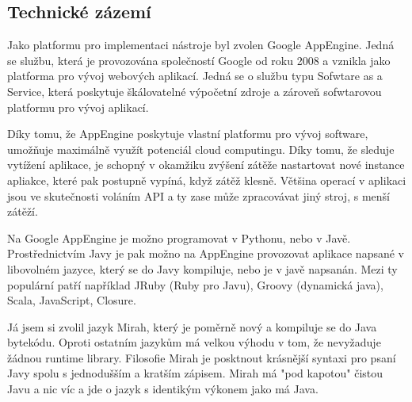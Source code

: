 \documentclass[bc,female,java,dept456]{diploma}						%
\begin{document}
\subsection{Technické zázemí}

Jako platformu pro implementaci nástroje byl zvolen Google AppEngine. Jedná se službu, která je provozována společností Google od roku 2008 a vznikla jako platforma pro vývoj webových aplikací. Jedná se o službu typu Sofwtare as a Service, která poskytuje škálovatelné výpočetní zdroje a zároveň sofwtarovou platformu pro vývoj aplikací.

Díky tomu, že AppEngine poskytuje vlastní platformu pro vývoj software, umožňuje maximálně využít potenciál cloud computingu. Díky tomu, že sleduje vytížení aplikace, je schopný v okamžiku zvýšení zátěže nastartovat nové instance apliakce, které pak postupně vypíná, když zátěž klesně. Většina operací v aplikaci jsou ve skutečnosti voláním API a ty zase může zpracovávat jiný stroj, s menší zátěží. 

Na Google AppEngine je možno programovat v Pythonu, nebo v Javě. Prostřednictvím Javy je pak možno na AppEngine provozovat aplikace napsané v libovolném jazyce, který se do Javy kompiluje, nebo je v javě napsanán. Mezi ty populární patří například JRuby (Ruby pro Javu), Groovy (dynamická java), Scala, JavaScript, Closure. 

Já jsem si zvolil jazyk Mirah, který je poměrně nový a kompiluje se do Java bytekódu. Oproti ostatním jazykům má velkou výhodu v tom, že nevyžaduje žádnou runtime library. Filosofie Mirah je posktnout krásnější syntaxi pro psaní Javy spolu s jednodušším a kratším zápisem. Mirah má "pod kapotou" čistou Javu a nic víc a jde o jazyk s identikým výkonem jako má Java.
\end{document}
